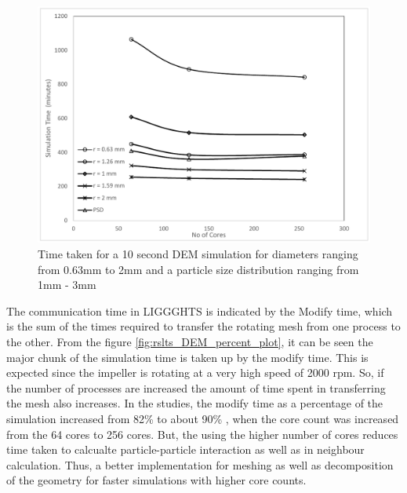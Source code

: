 \documentclass[preprint,11pt,authoryear]{elsarticle}
\begin{document}
\begin{figure}[H]
\centering
\includegraphics[scale=0.7]{rslts_DEM_timing_plots.pdf}
\caption{Time taken for a 10 second DEM simulation for diameters ranging from 0.63mm to 2mm and a particle size distribution ranging from 1mm - 3mm}
\label{fig:rslts_DEM_timing_studies}
\end{figure}
\par The communication time in LIGGGHTS is indicated by the Modify time, which is the sum of the times required to transfer the rotating mesh from one process to the other. From the figure \ref{fig:rslts_DEM_percent_plot}, it can be seen the major chunk of the simulation time is taken up by the modify time. This is expected since the impeller is rotating at a very high speed of 2000 rpm. So, if the number of processes are increased the amount of time spent in transferring the mesh also increases. In the studies, the modify time as a percentage of the simulation increased from 82\% to about 90\% , when the core count was increased from the 64 cores to 256 cores. But, the using the higher number of cores reduces time taken to calcualte particle-particle interaction as well as in neighbour calculation. Thus, a better implementation for meshing as well as decomposition of the geometry for faster simulations with higher core counts.
\end{document}
